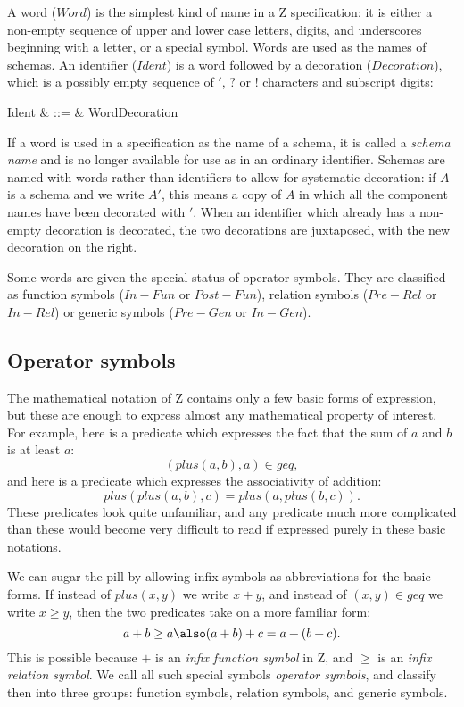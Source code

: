 \new A word (\(Word\)) is the simplest kind of name in a Z
specification:  it is either a non-empty sequence of upper and lower
case letters, digits, and underscores beginning with a letter, or a
special symbol. Words are used as the names of schemas.  An identifier
(\(Ident\)) is a word followed by a decoration
(\(Decoration\)), which is a possibly empty
sequence of ${}'$, $?$ or $!$ characters and subscript digits:
\begin{syntax}
        Ident & ::= & Word\;Decoration
\end{syntax}
If a word is used in a specification as the name of a schema, it is
called a {\em schema name\/} and is no longer
available for use as in an ordinary identifier. Schemas are named
with words rather than identifiers to allow for systematic
decoration: if $A$ is a schema and we write $A'$, this means a copy
of $A$ in which all the component names have been decorated with
${}'$.  When an identifier which already has a non-empty decoration
is decorated, the two decorations are juxtaposed, with the new decoration on the right.

Some words are given the special status of operator symbols. They
are classified as function symbols (\(In-Fun\) or
\(Post-Fun\)), relation symbols
(\(Pre-Rel\) or \(In-Rel\)) or
generic symbols (\(Pre-Gen\) or
\(In-Gen\)).

\subsection{Operator symbols}\label{ss:infix}

\new The
mathematical notation of Z contains only a few basic
forms of expression, but these are enough to express almost any
mathematical property of interest. For example, here is a predicate which
expresses the fact that the sum of $a$ and $b$ is at least $a$:
\[ (plus(a,b),a) \in geq, \]
and here is a predicate which expresses the
associativity of addition:
\[ plus(plus(a,b),c) = plus(a,plus(b,c)). \]
These predicates look quite unfamiliar, and any predicate much
more complicated than these would become very difficult to read
if expressed purely in these basic notations.

\new We can sugar the pill by allowing infix symbols as
abbreviations for the basic forms. If instead of $plus(x,y)$ we
write $x + y$, and instead of $(x,y) \in geq$ we write $x \geq y$,
then the two predicates take on a more familiar form:
\[
        a + b \geq a
\also
        (a + b) + c = a + (b + c).
\] 
This is possible because $+$ is an {\em infix function symbol\/} in
Z, and $\geq$ is an {\em infix relation symbol}.  We call all such
special symbols {\em operator symbols}, and classify then into three
groups: function symbols, relation symbols, and generic symbols.

